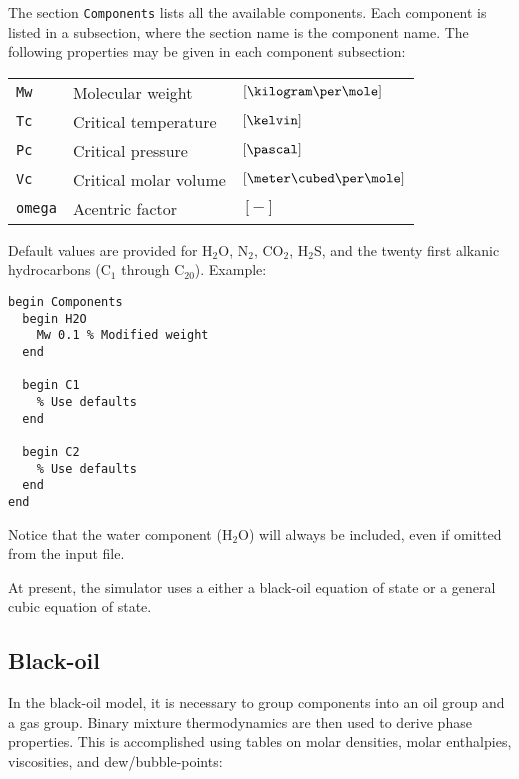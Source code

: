 

The section \texttt{Components} lists all the available components.
Each component is listed in a subsection, where the section name is
the component name. The following properties may be given in each
component subsection:

\begin{tabular}{lll}
  \texttt{Mw} & Molecular weight & $\left[\kilogram\per\mole\right]$ \\
  \texttt{Tc} & Critical temperature & $\left[\kelvin\right]$ \\
  \texttt{Pc} & Critical pressure & $\left[\pascal\right]$ \\
  \texttt{Vc} & Critical molar volume & $\left[\meter\cubed\per\mole\right]$ \\
  \texttt{omega} & Acentric factor & $\left[-\right]$
\end{tabular}

Default values are provided for H$_2$O, N$_2$, CO$_2$, H$_2$S, and the
twenty first alkanic hydrocarbons (C$_1$ through C$_{20}$). Example:

\begin{verbatim}
begin Components
  begin H2O
    Mw 0.1 % Modified weight
  end

  begin C1
    % Use defaults
  end

  begin C2
    % Use defaults
  end
end
\end{verbatim}

Notice that the water component (H$_2$O) will always be included, even
if omitted from the input file.



At present, the simulator uses a either a black-oil equation of state
or a general cubic equation of state.


\subsection{Black-oil}

In the black-oil model, it is necessary to group components into an
oil group and a gas group. Binary mixture thermodynamics are then used
to derive phase properties. This is accomplished using tables on molar
densities, molar enthalpies, viscosities, and dew/bubble-points:

